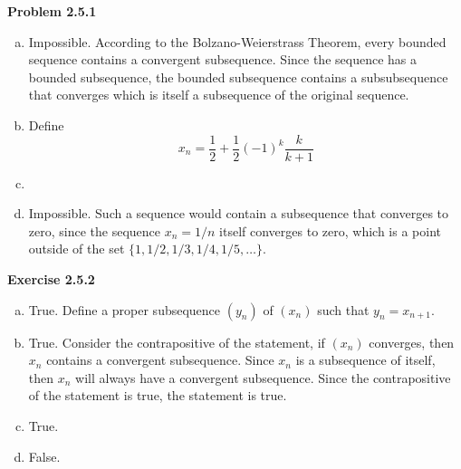 \documentclass{article}
\begin{document}
  \textbf{Problem 2.5.1}
  \begin{enumerate}[(a)]
  \item Impossible. According to the Bolzano-Weierstrass Theorem, every bounded
    sequence contains a convergent subsequence. Since the sequence has a bounded
    subsequence, the bounded subsequence contains a subsubsequence that converges
    which is itself a subsequence of the original sequence.

  \item Define
    \[x_{n} = \frac{1}{2} + \frac{1}{2} (-1)^{k} \frac{k}{k + 1}\]
  \item
  \item Impossible. Such a sequence would contain a subsequence that converges to
    zero, since the sequence \(x_{n} = 1 / n\) itself converges to zero, which is
    a point outside of the set \(\{1, 1/2, 1/3, 1/4, 1/5, \ldots\}\). 
  \end{enumerate}
  
  \textbf{Exercise 2.5.2}
  \begin{enumerate}[(a)]
  \item True. Define a proper subsequence \((y_{n})\) of \((x_{n})\) such that
    \(y_{n} = x_{n + 1}\).
  \item True. Consider the contrapositive of the statement, if \((x_{n})\)
    converges, then \(x_{n}\) contains a convergent subsequence. Since \(x_{n}\)
    is a subsequence of itself, then \(x_{n}\) will always have a convergent
    subsequence. Since the contrapositive of the statement is true, the statement
    is true.
  \item True.
    \item False. 
   
  \end{enumerate}
  
\end{document}
